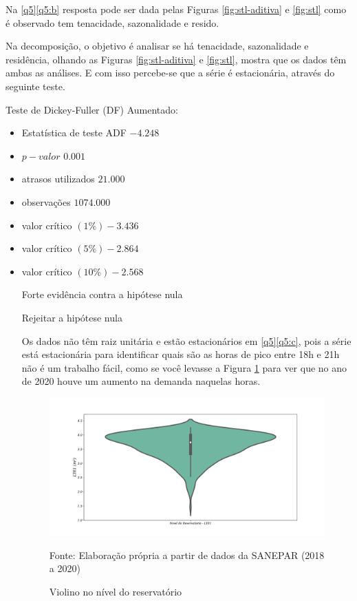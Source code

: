Na \ref{q5}\ref{q5:b} resposta pode ser dada pelas Figuras \ref{fig:stl-aditiva} e \ref{fig:stl} como é observado tem tenacidade, sazonalidade e resido. 

Na decomposição, o objetivo é analisar se há tenacidade, sazonalidade e residência, olhando as Figuras \ref{fig:stl-aditiva} e \ref{fig:stl}, mostra que os dados têm ambas as análises. E com isso percebe-se que a série é estacionária, através do seguinte teste.

Teste de Dickey-Fuller (DF) Aumentado: 
\begin{itemize}
	\item Estatística de teste ADF     $-4.248$
	\item $p-valor$                       $0.001$
	\item atrasos utilizados         $21.000$
	\item  observações              $1074.000$
	\item valor crítico $(1\%)           -3.436$
	\item valor crítico $(5\%)           -2.864$
	\item valor crítico $(10\%)          -2.568$
	
	
	Forte evidência contra a hipótese nula
	
	Rejeitar a hipótese nula
	
	Os dados não têm raiz unitária e estão estacionários em \ref{q5}\ref{q5:c}, pois a série está estacionária para identificar quais são as horas de pico entre 18h e 21h não é um trabalho fácil, como se você levasse a Figura \ref{fig:hist} para ver que no ano de 2020 houve um aumento na demanda naquelas horas.
	
	
	\begin{figure}[H]
		\centering
		\caption{Violino no nível do reservatório}
		\label{fig:hist}
		\includegraphics[width=0.9\linewidth]{Resultados/Figuras/viol}
		
		Fonte: Elaboração própria a partir de dados da SANEPAR (2018 a 2020)
	\end{figure}
	

\end{itemize}
